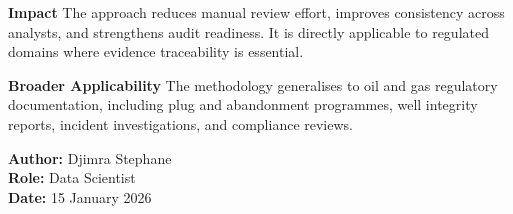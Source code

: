 \documentclass[12pt,a4paper]{article}
\begin{document}
\vspace{0.4cm}

\textbf{Impact}  
The approach reduces manual review effort, improves consistency across analysts, and strengthens audit readiness. It is directly applicable to regulated domains where evidence traceability is essential.

\vspace{0.4cm}

\textbf{Broader Applicability}  
The methodology generalises to oil and gas regulatory documentation, including plug and abandonment programmes, well integrity reports, incident investigations, and compliance reviews.

\vspace{0.8cm}

\noindent
\textbf{Author:} Djimra Stephane\\
\textbf{Role:} Data Scientist\\
\textbf{Date:} 15 January 2026
\end{document}
